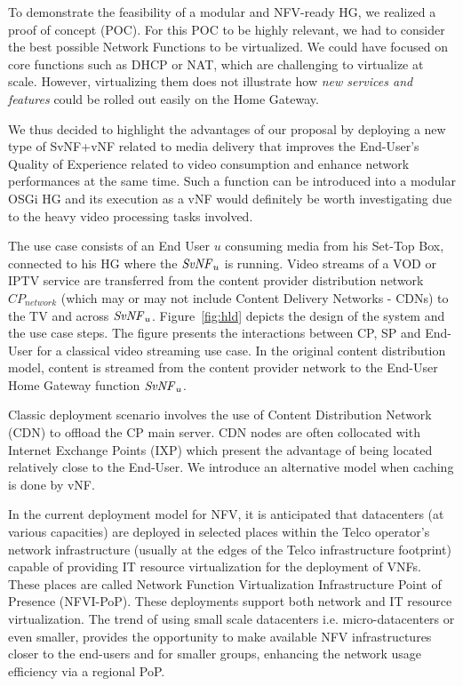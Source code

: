 To demonstrate the feasibility of a modular and NFV-ready HG, we realized a proof of concept (POC).
For this POC to be highly relevant, we had to consider the best possible Network Functions to be virtualized.
We could have focused on core functions such as DHCP or NAT, which are challenging to virtualize at scale. However, virtualizing them does not illustrate how \textit{new services and features} could be rolled out easily on the Home Gateway.

We thus decided to highlight the advantages of our proposal by deploying a new type of SvNF+vNF related to media delivery that improves the End-User's Quality of Experience related to video consumption and enhance network performances at the same time.
Such a function can be introduced into a modular OSGi HG and its execution as a vNF would definitely be worth investigating due to the heavy video processing tasks involved.

The use case consists of an End User $u$ consuming media from his Set-Top Box, connected to his HG where the $\mathit{SvNF}_{u}$ is running.
Video streams of a VOD or IPTV service are transferred from the content provider distribution network \(\mathit{CP}_{\mathit{network}}\) (which may or may not include Content Delivery Networks - CDNs) to the TV and across $\mathit{SvNF}_{u}$.
Figure~\ref{fig:hld} depicts the design of the system and the use case steps. The figure presents the interactions between CP, SP and End-User for a classical video streaming use case.
In the original content distribution model, content is streamed from the content provider network to the End-User Home Gateway function \(\mathit{SvNF}_{u}\).

Classic deployment scenario involves the use of Content Distribution Network (CDN) to offload the CP main server.
CDN nodes are often collocated with Internet Exchange Points (IXP) which present the advantage of being located relatively close to the End-User. We introduce an alternative model when caching is done by vNF.

In the  current deployment model for NFV, it is anticipated that datacenters (at various capacities) are deployed in selected places within the Telco operator’s network infrastructure (usually at the edges of the Telco infrastructure footprint) capable of providing IT resource virtualization for the deployment of VNFs. These places are called Network Function Virtualization Infrastructure Point of Presence (NFVI-PoP). These deployments support both network and IT resource virtualization. The trend of using small scale datacenters i.e. micro-datacenters or even smaller, provides the opportunity to make available NFV infrastructures closer to the end-users and for smaller groups, enhancing the network usage efficiency via a regional PoP.

